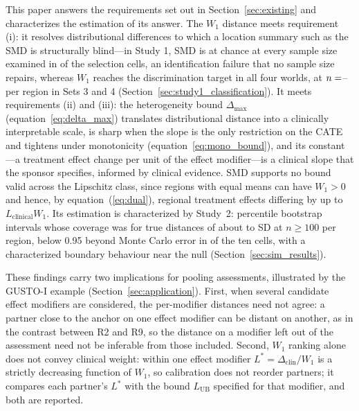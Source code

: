 \documentclass[AMA,Times1COL]{WileyNJDv5}
\begin{document}
This paper answers the requirements set out in Section~\ref{sec:existing} and characterizes the estimation of its answer. The $W_1$ distance meets requirement (i): it resolves distributional differences to which a location summary such as the SMD is structurally blind---in Study 1, SMD is at chance at every sample size examined in  of the  selection cells, an identification failure that no sample size repairs, whereas $W_1$ reaches the discrimination target in all four worlds, at $n = \numval{reqnW1minSets34}$-- per region in Sets 3 and 4 (Section~\ref{sec:study1_classification}). It meets requirements (ii) and (iii): the heterogeneity bound \(\Delta_{\max}\) (equation~\ref{eq:delta_max}) translates distributional distance into a clinically interpretable scale, is sharp when the slope is the only restriction on the CATE and tightens under monotonicity (equation~\ref{eq:mono_bound}), and its constant---a treatment effect change per unit of the effect modifier---is a clinical slope that the sponsor specifies, informed by clinical evidence. SMD supports no bound valid across the Lipschitz class, since regions with equal means can have $W_1 > 0$ and hence, by equation~(\ref{eq:dual}), regional treatment effects differing by up to $L_{\text{clinical}} W_1$. Its estimation is characterized by Study~2: percentile bootstrap intervals whose coverage was  for true distances of about  to  SD at $n \geq 100$ per region, below 0.95 beyond Monte Carlo error in  of the ten cells, with a characterized boundary behaviour near the null (Section~\ref{sec:sim_results}).

These findings carry two implications for pooling assessments, illustrated by the GUSTO-I example (Section~\ref{sec:application}). First, when several candidate effect modifiers are considered, the per-modifier distances need not agree: a partner close to the anchor on one effect modifier can be distant on another, as in the contrast between R2 and R9, so the distance on a modifier left out of the assessment need not be inferable from those included. Second, $W_1$ ranking alone does not convey clinical weight: within one effect modifier $L^* = \Delta_{\text{clin}} / W_1$ is a strictly decreasing function of $W_1$, so calibration does not reorder partners; it compares each partner's $L^*$ with the bound $L_{\text{UB}}$ specified for that modifier, and both are reported.
\end{document}
